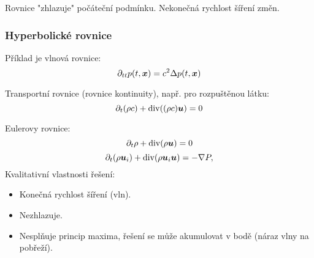  Rovnice "zhlazuje" počáteční podmínku.
Nekonečná rychlost šíření změn.
\subsubsection{Hyperbolické rovnice}

Příklad je vlnová rovnice:
\[
    \partial_{tt} p(t, \mathbf{\boldsymbol{x}}) = c^2 \Delta p(t, \mathbf{\boldsymbol{x}})
\]

Transportní rovnice (rovnice kontinuity), např. pro rozpuštěnou látku:
\[
    \partial_t (\rho c) + \operatorname{div}( (\rho c) \mathbf{\boldsymbol{u}})=0
\]

Eulerovy rovnice:
\[
    \partial_t \rho + \operatorname{div}( \rho \mathbf{\boldsymbol{u}})=0
\]
\[
    \partial_t (\rho \mathbf{\boldsymbol{u}}_i) +\operatorname{div}(\rho \mathbf{\boldsymbol{u}}_i \mathbf{\boldsymbol{u}}) = - \nabla P,
\]
Kvalitativní vlastnosti řešení:
\begin{itemize}
 \item Konečná rychlost šíření (vln).
 \item Nezhlazuje.  
 \item Nesplňuje princip maxima, řešení se může akumulovat v bodě (náraz vlny na pobřeží).
\end{itemize}


